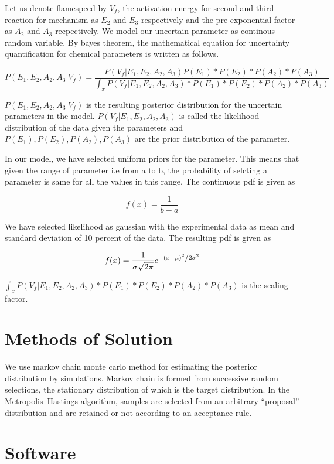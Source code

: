\noindent Let us denote flamespeed by $V_f$, the activation energy for second and third reaction for mechanism as $E_2$ and $E_3$ respectively and the pre exponential factor as $A_2$ and $A_3$ recpectively. We model our uncertain parameter as continous random variable. By bayes theorem, the mathematical equation for uncertainty quantification for chemical parameters is written as follows. 

$$P(E_1, E_2, A_2, A_3 |V_f ) = \frac{P(V_f|E_1, E_2, A_2, A_3) P(E_1)*P(E_2)*P(A_2)*P(A_3)}{\int_x P(V_f|E_1, E_2, A_2, A_3)* P(E_1)*P(E_2)*P(A_2)*P(A_3) }$$ 

\noindent $P(E_1, E_2, A_2, A_3 |V_f ) $ is the resulting posterior distribution for the uncertain parameters in the model. $P(V_f|E_1, E_2, A_2, A_3)$ is called the likelihood distribution of the data given the parameters and $ P(E_1), P(E_2) , P(A_2), P(A_3)$ are the prior distribution of the parameter. 

\noindent In our model, we have selected uniform priors for the parameter. This means that given the range of parameter i.e from a to b, the probability of selcting a parameter is same for all the values in this range. The continuous pdf is given as 

$$f(x) = \frac{1}{b -a}$$


\noindent We have selected likelihood as gaussian with the experimental data as mean and standard deviation of 10 percent of the data. The resulting pdf is given as 

$$f(x) = \frac{1}{{\sigma \sqrt {2\pi } }}e^{{{ - \left( {x - \mu } \right)^2 } \mathord{\left/ {\vphantom {{ - \left( {x - \mu } \right)^2 } {2\sigma ^2 }}} \right. \kern-\nulldelimiterspace} {2\sigma ^2 }}} $$

\noindent $\int_x P(V_f|E_1, E_2, A_2, A_3)* P(E_1)*P(E_2)*P(A_2)*P(A_3)$ is the scaling factor. 

\section{Methods of Solution}

\noindent We use markov chain monte carlo method for estimating the posterior distribution by simulations. Markov chain is formed from successive random selections, the stationary distribution of which is the target distribution. In the Metropolis–Hastings algorithm, samples are selected from an arbitrary “proposal” distribution and are retained or not according to an acceptance rule. 

\section{Software}